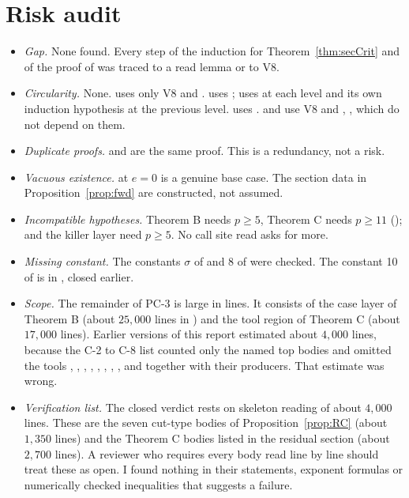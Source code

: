 \documentclass[11pt]{article}
\theoremstyle{definition}
\theoremstyle{remark}
\begin{document}
\section{Risk audit}

\begin{itemize}[leftmargin=*,itemsep=1pt]
\item \emph{Gap.} None found. Every step of the induction for Theorem~\ref{thm:secCrit} and of the proof of  was traced to a read lemma or to V8.
\item \emph{Circularity.} None.  uses only V8 and .  uses ;  uses  at each level and its own induction hypothesis at the previous level.  uses .  and  use V8 and , , which do not depend on them.
\item \emph{Duplicate proofs.}  and  are the same proof. This is a redundancy, not a risk.
\item \emph{Vacuous existence.}  at $e=0$ is a genuine base case. The section data in Proposition~\ref{prop:fwd} are constructed, not assumed.
\item \emph{Incompatible hypotheses.} Theorem B needs $p\ge5$, Theorem C needs $p\ge11$ ();  and the killer layer need $p\ge5$. No call site read asks for more.
\item \emph{Missing constant.} The constants $\sigma$ of  and $8$ of  were checked. The constant 10 of  is in , closed earlier.
\item \emph{Scope.} The remainder of PC-3 is large in lines. It consists of the case layer of Theorem B (about $25{,}000$ lines in ) and the tool region of Theorem C (about $17{,}000$ lines). Earlier versions of this report estimated about $4{,}000$ lines, because the C-2 to C-8 list counted only the named top bodies and omitted the tools , , , , , , , ,  and  together with their producers. That estimate was wrong.
\item \emph{Verification list.} The closed verdict rests on skeleton reading of about $4{,}000$ lines. These are the seven cut-type bodies of Proposition~\ref{prop:RC} (about $1{,}350$ lines) and the Theorem C bodies listed in the residual section (about $2{,}700$ lines). A reviewer who requires every body read line by line should treat these as open. I found nothing in their statements, exponent formulas or numerically checked inequalities that suggests a failure.

\end{itemize}
\end{document}
